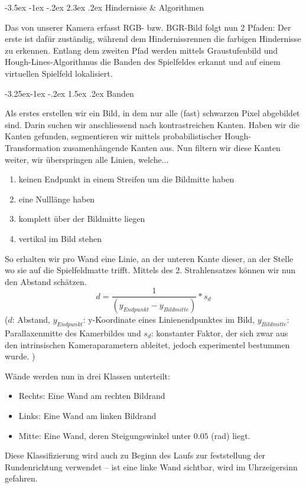\documentclass[a4paper]{scrarticle}
\makeatletter
\renewcommand\section{\@startsection {section}{1}{\z@}%
                                   {-3.5ex \@plus -1ex \@minus -.2ex}%
                                   {2.3ex \@plus.2ex}%
                                   {\Huge\AKAfont}}
\renewcommand\subsection{\@startsection{subsection}{2}{\z@}%
                                     {-3.25ex\@plus -1ex \@minus -.2ex}%
                                     {1.5ex \@plus .2ex}%
                                     {\Large\AKAfont}}
\makeatother
\begin{document}
\section{Hindernisse \& Algorithmen}

Das von unserer Kamera erfasst RGB- bzw. BGR-Bild folgt nun 2 Pfaden: Der erste ist dafür zuständig, während dem Hindernissrennen die farbigen Hindernisse zu erkennen. Entlang dem zweiten Pfad werden mittels Graustufenbild und Hough-Lines-Algorithmus die Banden des Spielfeldes erkannt und auf einem virtuellen Spielfeld lokalisiert.

\subsection{Banden}

Als erstes erstellen wir ein Bild, in dem nur alle (fast) schwarzen Pixel abgebildet sind. Darin suchen wir anschliessend nach kontrastreichen Kanten.
Haben wir die Kanten gefunden, segmentieren wir mittels probabilistischer Hough-Transformation zusamenhängende Kanten aus.
Nun filtern wir diese Kanten weiter, wir überspringen alle Linien, welche...
\begin{enumerate}
	\item {keinen Endpunkt in einem Streifen um die Bildmitte haben}
	\item {eine Nulllänge haben}
	\item {komplett über der Bildmitte liegen}
	\item {vertikal im Bild stehen}
\end{enumerate}
So erhalten wir pro Wand eine Linie, an der unteren Kante dieser, an der Stelle wo sie auf die Spielfeldmatte trifft.
Mittels des 2. Strahlensatzes können wir nun den Abstand schätzen.
$$
d = \frac{1}{(y_{Endpunkt}-y_{Bildmitte})} * s_d
$$
($d$: Abstand, $y_{Endpunkt}$: y-Koordinate eines Linienendpunktes im Bild, $y_{Bildmitte}$: Parallaxenmitte des Kamerbildes und $s_d$: konstanter Faktor, der sich zwar aus den intrinsischen Kameraparametern ableitet, jedoch experimentel bestummen wurde. )

Wände werden nun in drei Klassen unterteilt:
\begin{itemize}
	\item Rechts: Eine Wand am rechten Bildrand
	\item Links: Eine Wand am linken Bildrand
	\item Mitte: Eine Wand, deren Steigungswinkel unter $0.05$ (rad) liegt.
\end{itemize}
Diese Klassifizierung wird auch zu Beginn des Laufs zur feststellung der Rundenrichtung verwendet – ist eine linke Wand sichtbar, wird im Uhrzeigersinn gefahren.
\end{document}
